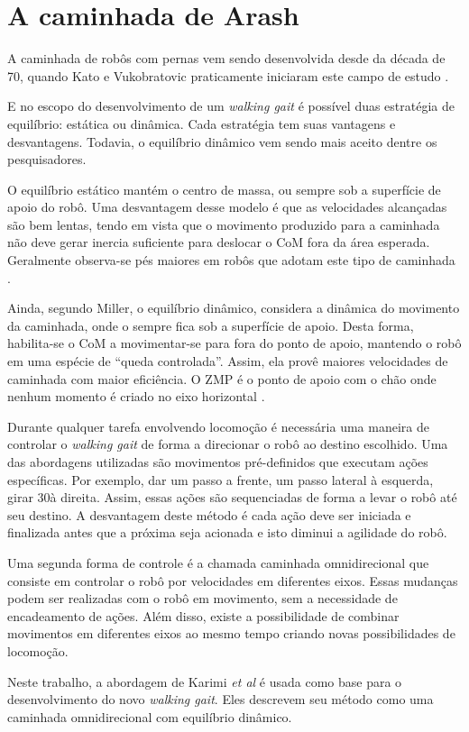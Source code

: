 \chapter{A caminhada de Arash}

A caminhada de robôs com pernas vem sendo desenvolvida desde da década de 70, quando Kato e Vukobratovic praticamente iniciaram este campo de estudo \cite{kajita2008}.

E no escopo do desenvolvimento de um \textit{walking gait} é possível duas estratégia de equilíbrio: estática ou dinâmica. Cada estratégia tem suas vantagens e desvantagens. Todavia, o equilíbrio dinâmico vem sendo mais aceito dentre os pesquisadores.
	
O equilíbrio estático mantém o centro de massa, ou  sempre sob a superfície de apoio do robô. Uma desvantagem desse modelo é que as velocidades alcançadas são bem lentas, tendo em vista que o movimento produzido para a caminhada não deve gerar inercia suficiente para deslocar o CoM fora da área esperada. Geralmente observa-se pés maiores em robôs que adotam este tipo de caminhada \cite{miller1994}.

Ainda, segundo Miller, o equilíbrio dinâmico, considera a dinâmica do movimento da caminhada, onde o  sempre fica sob a superfície de apoio. Desta forma, habilita-se o CoM a movimentar-se para fora do ponto de apoio, mantendo o robô em uma espécie de ``queda controlada''. Assim, ela provê maiores velocidades de caminhada com maior eficiência. O ZMP é o ponto de apoio com o chão onde nenhum momento é criado no eixo horizontal \cite{kajita2008}.

Durante qualquer tarefa envolvendo locomoção é necessária uma maneira de controlar o \textit{walking gait} de forma a direcionar o robô ao destino escolhido. Uma das abordagens utilizadas são movimentos pré-definidos que executam ações específicas. Por exemplo, dar um passo a frente, um passo lateral à esquerda, girar 30\degree à direita. Assim, essas ações são sequenciadas de forma a levar o robô até seu destino. A desvantagem deste método é cada ação deve ser iniciada e finalizada antes que a próxima seja acionada e isto diminui a agilidade do robô.

Uma segunda forma de controle é a chamada caminhada omnidirecional que consiste em controlar o robô por velocidades em diferentes eixos. Essas mudanças podem ser realizadas com o robô em movimento, sem a necessidade de encadeamento de ações. Além disso, existe a possibilidade de combinar movimentos em diferentes eixos ao mesmo tempo criando novas possibilidades de locomoção.

Neste trabalho, a abordagem de Karimi \textit{et al} é usada como base para o desenvolvimento do novo \textit{walking gait}. Eles descrevem seu método como uma caminhada omnidirecional com equilíbrio dinâmico.